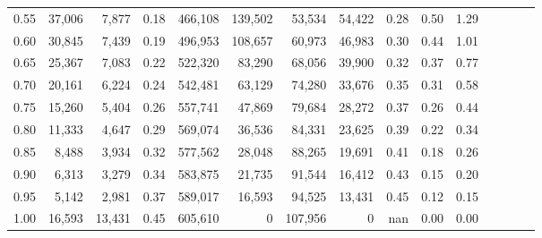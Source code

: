 \begin{tabular}{rrrcrrrrrrrrrrr}
0.55 &  37,006 &   7,877 &                                       0.18 &  466,108 &  139,502 &   53,534 &   54,422 &  0.28 &  0.50 &                         1.29 \\
0.60 &  30,845 &   7,439 &                                       0.19 &  496,953 &  108,657 &   60,973 &   46,983 &  0.30 &  0.44 &                         1.01 \\
0.65 &  25,367 &   7,083 &                                       0.22 &  522,320 &   83,290 &   68,056 &   39,900 &  0.32 &  0.37 &                         0.77 \\
0.70 &  20,161 &   6,224 &                                       0.24 &  542,481 &   63,129 &   74,280 &   33,676 &  0.35 &  0.31 &                         0.58 \\
0.75 &  15,260 &   5,404 &                                       0.26 &  557,741 &   47,869 &   79,684 &   28,272 &  0.37 &  0.26 &                         0.44 \\
0.80 &  11,333 &   4,647 &                                       0.29 &  569,074 &   36,536 &   84,331 &   23,625 &  0.39 &  0.22 &                         0.34 \\
0.85 &   8,488 &   3,934 &                                       0.32 &  577,562 &   28,048 &   88,265 &   19,691 &  0.41 &  0.18 &                         0.26 \\
0.90 &   6,313 &   3,279 &                                       0.34 &  583,875 &   21,735 &   91,544 &   16,412 &  0.43 &  0.15 &                         0.20 \\
0.95 &   5,142 &   2,981 &                                       0.37 &  589,017 &   16,593 &   94,525 &   13,431 &  0.45 &  0.12 &                         0.15 \\
1.00 &  16,593 &  13,431 &                                       0.45 &  605,610 &        0 &  107,956 &        0 &   nan &  0.00 &                         0.00 \\
\bottomrule
\end{tabular}

